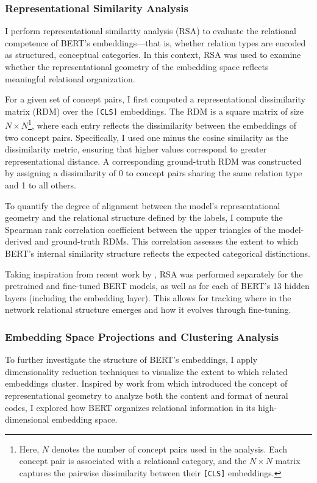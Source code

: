 \documentclass[stu,floatsintext]{apa7}
\begin{document}
\subsubsection{Representational Similarity Analysis}

I perform representational similarity analysis (RSA) to evaluate the relational competence of BERT's embeddings—that is, whether relation types are encoded as structured, conceptual categories. In this context, RSA was used to examine whether the representational geometry of the embedding space reflects meaningful relational organization.

For a given set of concept pairs, I first computed a representational dissimilarity matrix (RDM) over the \texttt{[CLS]} embeddings. The RDM is a square matrix of size $N \times N$\footnote{Here, $N$ denotes the number of concept pairs used in the analysis. Each concept pair is associated with a relational category, and the $N \times N$ matrix captures the pairwise dissimilarity between their \texttt{[CLS]} embeddings.}, where each entry reflects the dissimilarity between the embeddings of two concept pairs. Specifically, I used one minus the cosine similarity as the dissimilarity metric, ensuring that higher values correspond to greater representational distance. A corresponding ground-truth RDM was constructed by assigning a dissimilarity of 0 to concept pairs sharing the same relation type and 1 to all others.

To quantify the degree of alignment between the model's representational geometry and the relational structure defined by the labels, I compute the Spearman rank correlation coefficient between the upper triangles of the model-derived and ground-truth RDMs. This correlation assesses the extent to which BERT's internal similarity structure reflects the expected categorical distinctions.

Taking inspiration from recent work by \textcite{gandikota2024evolution}, RSA was performed separately for the pretrained and fine-tuned BERT models, as well as for each of BERT's 13 hidden layers (including the embedding layer). This allows for tracking where in the network relational structure emerges and how it evolves through fine-tuning.

\subsubsection{Embedding Space Projections and Clustering Analysis}

To further investigate the structure of BERT's embeddings, I apply dimensionality reduction techniques to visualize the extent to which related embeddings cluster. Inspired by work from \textcite{Kriegeskorte2013} which introduced the concept of representational geometry to analyze both the content and format of neural codes, I explored how BERT organizes relational information in its high-dimensional embedding space.
\end{document}
